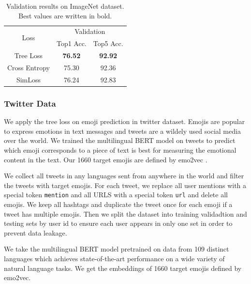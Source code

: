 \documentclass[twoside]{article}
\theoremstyle{definition}
\begin{document}
\begin{table}[]
\caption{Validation results on ImageNet dataset. Best values are written in bold.} \label{imagenet}
\begin{center}
\begin{tabular}{@{}ccc@{}}
\toprule
\multirow{2}{*}{Loss} & \multicolumn{2}{c}{Validation} \\ \cmidrule(l){2-3} 
                      & Top1 Acc.      & Top5 Acc.     \\ \cmidrule(r){1-1}
Tree Loss       & \textbf{76.52} & \textbf{92.92} \\
Cross Entropy         & 75.30          & 92.36         \\
SimLoss               & 76.24          & 92.83         \\ \bottomrule
\end{tabular}
\end{center}
\end{table}


\subsubsection{Twitter Data}

We apply the tree loss on emoji prediction in twitter dataset. 
Emojis are popular to express emotions in text messages and tweets are a wildely used social media over the world. 
We trained the multilingual BERT model on tweets to predict which emoji corresponds to a piece of text is best for measuring the emotional content in the text. 
Our 1660 target emojis are defined by emo2vec \cite{Eisner2016emoji2vecLE}.

We collect all tweets \cite{Izbicki2019GeolocatingTI} in any languages sent from anywhere in the world and filter the tweets with target emojis. 
For each tweet, we replace all user mentions with a special token \texttt{\text{<}mention\text{>}} and all URLS with a special token \texttt{\text{<}url\text{>}} and delete all emojis. 
We keep all hashtags and duplicate the tweet once for each emoji if a tweet has multiple emojis. 
Then we split the dataset into training validadtion and testing sets by user id to ensure each user appears in only one set in order to prevent data leakage.

We take the multilingual BERT model \cite{Feng2020LanguageagnosticBS} pretrained on data from 109 distinct languages which achieves state-of-the-art performance on a wide variety of natural language tasks. 
We get the embeddings of 1660 target emojis defined by emo2vec.
\end{document}
